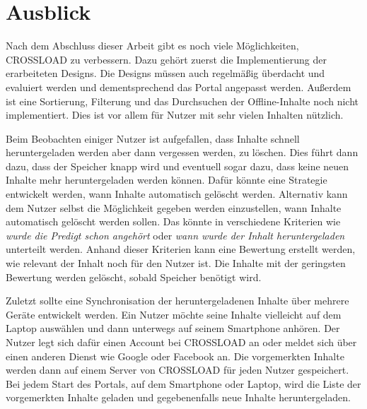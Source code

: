 \section{Ausblick}
Nach dem Abschluss dieser Arbeit gibt es noch viele Möglichkeiten, CROSSLOAD zu verbessern. Dazu gehört zuerst die Implementierung der erarbeiteten Designs. Die Designs müssen auch regelmäßig überdacht und evaluiert werden und dementsprechend das Portal angepasst werden. Außerdem ist eine Sortierung, Filterung und das Durchsuchen der Offline-Inhalte noch nicht implementiert. Dies ist vor allem für Nutzer mit sehr vielen Inhalten nützlich. 

Beim Beobachten einiger Nutzer ist aufgefallen, dass Inhalte schnell heruntergeladen werden aber dann vergessen werden, zu löschen. Dies führt dann dazu, dass der Speicher knapp wird und eventuell sogar dazu, dass keine neuen Inhalte mehr heruntergeladen werden können. Dafür könnte eine Strategie entwickelt werden, wann Inhalte automatisch gelöscht werden. Alternativ kann dem Nutzer selbst die Möglichkeit gegeben werden einzustellen, wann Inhalte automatisch gelöscht werden sollen. Das könnte in verschiedene Kriterien wie \textit{wurde die Predigt schon angehört} oder \textit{wann wurde der Inhalt heruntergeladen} unterteilt werden. Anhand dieser Kriterien kann eine Bewertung erstellt werden, wie relevant der Inhalt noch für den Nutzer ist. Die Inhalte mit der geringsten Bewertung werden gelöscht, sobald Speicher benötigt wird.

Zuletzt sollte eine Synchronisation der heruntergeladenen Inhalte über mehrere Geräte entwickelt werden. Ein Nutzer möchte seine Inhalte vielleicht auf dem Laptop auswählen und dann unterwegs auf seinem Smartphone anhören. Der Nutzer legt sich dafür einen Account bei CROSSLOAD an oder meldet sich über einen anderen Dienst wie Google oder Facebook an. Die vorgemerkten Inhalte werden dann auf einem Server von CROSSLOAD für jeden Nutzer gespeichert. Bei jedem Start des Portals, auf dem Smartphone oder Laptop, wird die Liste der vorgemerkten Inhalte geladen und gegebenenfalls neue Inhalte heruntergeladen. 
